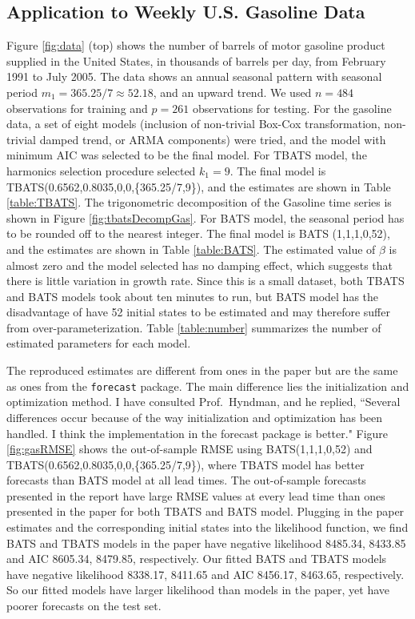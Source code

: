 \documentclass{uwstat572}
\begin{document}
\subsection{Application to Weekly U.S. Gasoline Data}
\hspace{4ex}Figure \ref{fig:data} (top) shows the number of barrels of motor gasoline product supplied in the United States, in thousands of barrels per day, from February 1991 to July 2005. The data shows an annual seasonal pattern with seasonal period $m_1=365.25/7 \approx 52.18$, and an upward trend. We used $n=484$ observations for training and $p=261$ observations for testing. For the gasoline data, a set of eight models (inclusion of non-trivial Box-Cox transformation, non-trivial damped trend, or ARMA components) were tried, and the model with minimum AIC was selected to be the final model.  For TBATS model, the harmonics selection procedure selected $k_1=9$. The final model is TBATS(0.6562,0.8035,0,0,\{365.25/7,9\}), and the estimates are shown in Table \ref{table:TBATS}. The trigonometric decomposition of the Gasoline time series is shown in Figure \ref{fig:tbatsDecompGas}. For BATS model, the seasonal period has to be rounded off to the nearest integer. The final model is BATS (1,1,1,0,52), and the estimates are shown in Table \ref{table:BATS}. The estimated value of $\beta$ is almost zero and the model selected has no damping effect, which suggests that there is little variation in growth rate. Since this is a small dataset, both TBATS and BATS models took about ten minutes to run, but BATS model has the disadvantage of have 52 initial states to be estimated and may therefore suffer from over-parameterization. Table \ref{table:number} summarizes the number of estimated parameters for each model.

The reproduced estimates are different from ones in the paper but are the same as ones from the \texttt{forecast} package. The main difference lies the initialization and optimization method. I have consulted Prof.\ Hyndman, and he replied, ``Several differences occur because of the way initialization and optimization has been handled. I think the implementation in the forecast package is better." Figure \ref{fig:gasRMSE} shows the out-of-sample RMSE using BATS(1,1,1,0,52) and TBATS(0.6562,0.8035,0,0,\{365.25/7,9\}), where TBATS model has better forecasts than BATS model at all lead times. The out-of-sample forecasts presented in the report have large RMSE values at every lead time than ones presented in the paper for both TBATS and BATS model. Plugging in the paper estimates and the corresponding initial states into the likelihood function, we find BATS and TBATS models in the paper have negative likelihood 8485.34, 8433.85 and AIC 8605.34, 8479.85, respectively. Our fitted BATS and TBATS models have negative likelihood 8338.17, 8411.65 and AIC 8456.17, 8463.65, respectively. So our fitted models have larger likelihood than models in the paper, yet have poorer forecasts on the test set. 
\end{document}
